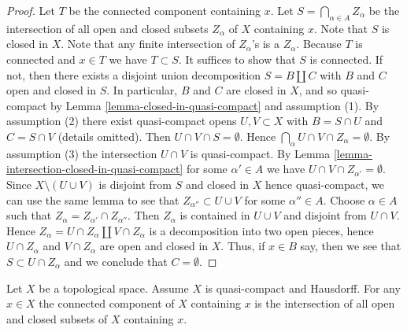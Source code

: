 \begin{proof}
Let $T$ be the connected component containing $x$.
Let $S = \bigcap_{\alpha \in A} Z_\alpha$ be the intersection of all
open and closed subsets $Z_\alpha$ of $X$ containing $x$.
Note that $S$ is closed in $X$.
Note that any finite intersection of $Z_\alpha$'s is a $Z_\alpha$.
Because $T$ is connected and $x \in T$ we have $T \subset S$.
It suffices to show that $S$ is connected.
If not, then there exists a disjoint union decomposition
$S = B \amalg C$ with $B$ and $C$ open and closed in $S$.
In particular, $B$ and $C$ are closed in $X$, and so quasi-compact by
Lemma \ref{lemma-closed-in-quasi-compact} and assumption (1).
By assumption (2) there exist quasi-compact opens
$U, V \subset X$ with $B = S \cap U$ and $C = S \cap V$ (details omitted).
Then $U \cap V \cap S = \emptyset$.
Hence $\bigcap_\alpha U \cap V \cap Z_\alpha = \emptyset$.
By assumption (3) the intersection $U \cap V$ is quasi-compact.
By Lemma \ref{lemma-intersection-closed-in-quasi-compact}
for some $\alpha' \in A$ we have $U \cap V \cap Z_{\alpha'} = \emptyset$.
Since $X \setminus (U \cup V)$ is disjoint from $S$
and closed in $X$ hence quasi-compact, we can use the same lemma
to see that $Z_{\alpha''} \subset U \cup V$ for some $\alpha'' \in A$.
Choose $\alpha \in A$ such that
$Z_\alpha = Z_{\alpha'} \cap Z_{\alpha''}$. Then $Z_\alpha$ is contained
in $U \cup V$ and disjoint from $U \cap V$.
Hence $Z_\alpha = U \cap Z_\alpha \amalg V \cap Z_\alpha$
is a decomposition into two open pieces,
hence $U \cap Z_\alpha$ and $V \cap Z_\alpha$ are open and closed in $X$.
Thus, if $x \in B$ say, then we see that $S \subset U \cap Z_\alpha$
and we conclude that $C = \emptyset$.
\end{proof}

\begin{lemma}
\label{lemma-connected-component-intersection-compact-Hausdorff}
Let $X$ be a topological space. Assume $X$ is quasi-compact and Hausdorff.
For any $x \in X$ the connected component of $X$ containing
$x$ is the intersection of all open and closed subsets
of $X$ containing $x$.
\end{lemma}

